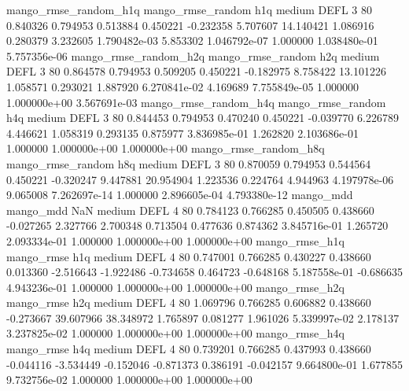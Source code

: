 mango_rmse_random_h1q mango_rmse_random                  h1q     medium     DEFL                 3 80  0.840326       0.794953 0.513884       0.450221   -0.232358      5.707607     14.140421     1.086916       0.280379  3.232605 1.790482e-03     5.853302   1.046792e-07            1.000000    1.038480e-01        5.757356e-06
mango_rmse_random_h2q mango_rmse_random                  h2q     medium     DEFL                 3 80  0.864578       0.794953 0.509205       0.450221   -0.182975      8.758422     13.101226     1.058571       0.293021  1.887920 6.270841e-02     4.169689   7.755849e-05            1.000000    1.000000e+00        3.567691e-03
mango_rmse_random_h4q mango_rmse_random                  h4q     medium     DEFL                 3 80  0.844453       0.794953 0.470240       0.450221   -0.039770      6.226789      4.446621     1.058319       0.293135  0.875977 3.836985e-01     1.262820   2.103686e-01            1.000000    1.000000e+00        1.000000e+00
mango_rmse_random_h8q mango_rmse_random                  h8q     medium     DEFL                 3 80  0.870059       0.794953 0.544564       0.450221   -0.320247      9.447881     20.954904     1.223536       0.224764  4.944963 4.197978e-06     9.065008   7.262697e-14            1.000000    2.896605e-04        4.793380e-12
            mango_mdd         mango_mdd                  NaN     medium     DEFL                 4 80  0.784123       0.766285 0.450505       0.438660   -0.027265      2.327766      2.700348     0.713504       0.477636  0.874362 3.845716e-01     1.265720   2.093334e-01            1.000000    1.000000e+00        1.000000e+00
       mango_rmse_h1q        mango_rmse                  h1q     medium     DEFL                 4 80  0.747001       0.766285 0.430227       0.438660    0.013360     -2.516643     -1.922486    -0.734658       0.464723 -0.648168 5.187558e-01    -0.686635   4.943236e-01            1.000000    1.000000e+00        1.000000e+00
       mango_rmse_h2q        mango_rmse                  h2q     medium     DEFL                 4 80  1.069796       0.766285 0.606882       0.438660   -0.273667     39.607966     38.348972     1.765897       0.081277  1.961026 5.339997e-02     2.178137   3.237825e-02            1.000000    1.000000e+00        1.000000e+00
       mango_rmse_h4q        mango_rmse                  h4q     medium     DEFL                 4 80  0.739201       0.766285 0.437993       0.438660   -0.044116     -3.534449     -0.152046    -0.871373       0.386191 -0.042157 9.664800e-01     1.677855   9.732756e-02            1.000000    1.000000e+00        1.000000e+00
